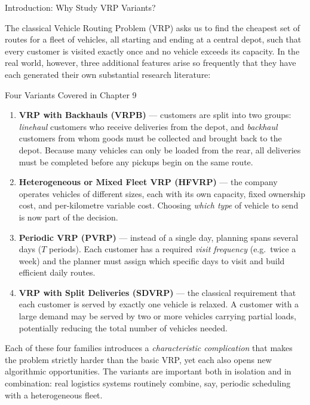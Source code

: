 \documentclass[aspectratio=169,10pt]{beamer}
\begin{document}
\begin{frame}[allowframebreaks]{Introduction: Why Study VRP Variants?}

The classical Vehicle Routing Problem (VRP) asks us to find the cheapest set
of routes for a fleet of vehicles, all starting and ending at a central depot,
such that every customer is visited exactly once and no vehicle exceeds its
capacity.  In the real world, however, three additional features arise so
frequently that they have each generated their own substantial research
literature:

\begin{block}{Four Variants Covered in Chapter 9}
  \begin{enumerate}
    \item \textbf{VRP with Backhauls (VRPB)} --- customers are split into two
          groups: \emph{linehaul} customers who receive deliveries from the
          depot, and \emph{backhaul} customers from whom goods must be
          collected and brought back to the depot.  Because many vehicles can
          only be loaded from the rear, all deliveries must be completed before
          any pickups begin on the same route.
    \item \textbf{Heterogeneous or Mixed Fleet VRP (HFVRP)} --- the company
          operates vehicles of different sizes, each with its own capacity,
          fixed ownership cost, and per-kilometre variable cost.  Choosing
          \emph{which type} of vehicle to send is now part of the decision.
    \item \textbf{Periodic VRP (PVRP)} --- instead of a single day, planning
          spans several days ($T$ periods).  Each customer has a required
          \emph{visit frequency} (e.g.\ twice a week) and the planner must
          assign which specific days to visit and build efficient daily routes.
    \item \textbf{VRP with Split Deliveries (SDVRP)} --- the classical
          requirement that each customer is served by exactly one vehicle is
          relaxed.  A customer with a large demand may be served by two or more
          vehicles carrying partial loads, potentially reducing the total
          number of vehicles needed.
  \end{enumerate}
\end{block}

\framebreak

Each of these four families introduces a \emph{characteristic complication}
that makes the problem strictly harder than the basic VRP, yet each also
opens new algorithmic opportunities.  The variants are important both in
isolation and in combination: real logistics systems routinely combine, say,
periodic scheduling with a heterogeneous fleet.


\end{frame}
\end{document}
